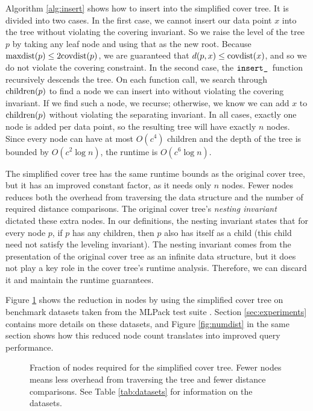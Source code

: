 \documentclass[../main.tex]{subfiles}
\newcommand{\mkfunction}[1]{\ifmmode{\textnormal{{#1}}}}
\newcommand{\children}[1]   {\mkfunction{children}({#1})}
\newcommand{\covdist}[1]    {\mkfunction{covdist}({#1})}
\newcommand{\maxdist}[1]    {\mkfunction{maxdist}({#1})}
\newcommand{\ctinsertHelper}{\ensuremath{\text{\ttfamily insert\_}}}
\begin{document}
Algorithm \ref{alg:insert} shows how to insert into the simplified cover tree.
It is divided into two cases.
In the first case, we cannot insert our data point $x$ into the tree without violating the covering invariant.
So we raise the level of the tree $p$ by taking any leaf node and using that as the new root.
Because $\maxdist{p} \le 2\covdist{p}$, we are guaranteed that $d(p,x) \le \covdist{x}$, and so we do not violate the covering constraint.
In the second case, the \ctinsertHelper~function recursively descends the tree.
On each function call, we search through $\children{p}$ to find a node we can insert into without violating the covering invariant.
If we find such a node, we recurse; otherwise, we know we can add $x$ to $\children{p}$ without violating the separating invariant.
In all cases, exactly one node is added per data point, so the resulting tree will have exactly $n$ nodes.
Since every node can have at most $O(c^4)$ children
and the depth of the tree is bounded by $O(c^2\log n)$,
the runtime is $O(c^6 \log n)$.

The simplified cover tree has the same runtime bounds as the original cover tree,
but it has an improved constant factor, as it needs only $n$ nodes.
Fewer nodes reduces both the overhead from traversing the data structure and the number of required distance comparisons.
The original cover tree's \emph{nesting invariant} dictated these extra nodes.
In our definitions, the nesting invariant states that
for every node $p$, if $p$ has any children, then $p$ also has itself as a child (this child need not satisfy the leveling invariant).
The nesting invariant comes from the presentation of the original cover tree as an infinite data structure,
but it does not play a key role in the cover tree's runtime analysis.
Therefore, we can discard it and maintain the runtime guarantees.

Figure \ref{fig:nodes} shows the reduction in nodes by using the simplified cover tree on benchmark datasets taken from the MLPack test suite \cite{mlpack2013}.
Section \ref{sec:experiments} contains more details on these datasets,
and Figure \ref{fig:numdist} in the same section shows how this reduced node count translates into improved query performance.

\begin{figure}[t]
\centering
\caption{
	Fraction of nodes required for the simplified cover tree.
    Fewer nodes means less overhead from traversing the tree and fewer distance comparisons.
    See Table \ref{tab:datasets} for information on the datasets.
    }
\label{fig:nodes}
\end{figure}
\end{document}
